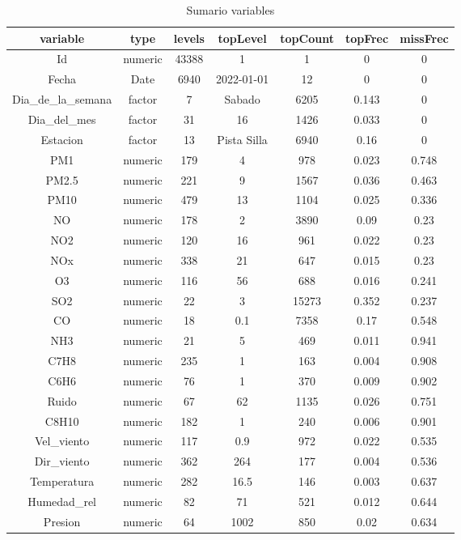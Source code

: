 \documentclass[notspecified,article,submit,moreauthors,pdftex]{Definitions/mdpi}
\begin{document}
\begin{table}[H]

\caption{\label{tab:unnamed-chunk-4}Sumario variables\label{tabla:anexo1}}
\fontsize{7}{9}\selectfont
\begin{tabular}[t]{ccccccc}
\toprule
variable & type & levels & topLevel & topCount & topFrec & missFrec\\
\midrule
Id & numeric & 43388 & 1 & 1 & 0 & 0\\
Fecha & Date & 6940 & 2022-01-01 & 12 & 0 & 0\\
Dia\_de\_la\_semana & factor & 7 & Sabado & 6205 & 0.143 & 0\\
Dia\_del\_mes & factor & 31 & 16 & 1426 & 0.033 & 0\\
Estacion & factor & 13 & Pista Silla & 6940 & 0.16 & 0\\
\addlinespace
PM1 & numeric & 179 & 4 & 978 & 0.023 & 0.748\\
PM2.5 & numeric & 221 & 9 & 1567 & 0.036 & 0.463\\
PM10 & numeric & 479 & 13 & 1104 & 0.025 & 0.336\\
NO & numeric & 178 & 2 & 3890 & 0.09 & 0.23\\
NO2 & numeric & 120 & 16 & 961 & 0.022 & 0.23\\
\addlinespace
NOx & numeric & 338 & 21 & 647 & 0.015 & 0.23\\
O3 & numeric & 116 & 56 & 688 & 0.016 & 0.241\\
SO2 & numeric & 22 & 3 & 15273 & 0.352 & 0.237\\
CO & numeric & 18 & 0.1 & 7358 & 0.17 & 0.548\\
NH3 & numeric & 21 & 5 & 469 & 0.011 & 0.941\\
\addlinespace
C7H8 & numeric & 235 & 1 & 163 & 0.004 & 0.908\\
C6H6 & numeric & 76 & 1 & 370 & 0.009 & 0.902\\
Ruido & numeric & 67 & 62 & 1135 & 0.026 & 0.751\\
C8H10 & numeric & 182 & 1 & 240 & 0.006 & 0.901\\
Vel\_viento & numeric & 117 & 0.9 & 972 & 0.022 & 0.535\\
\addlinespace
Dir\_viento & numeric & 362 & 264 & 177 & 0.004 & 0.536\\
Temperatura & numeric & 282 & 16.5 & 146 & 0.003 & 0.637\\
Humedad\_rel & numeric & 82 & 71 & 521 & 0.012 & 0.644\\
Presion & numeric & 64 & 1002 & 850 & 0.02 & 0.634\\

\end{tabular}
\end{table}
\end{document}
